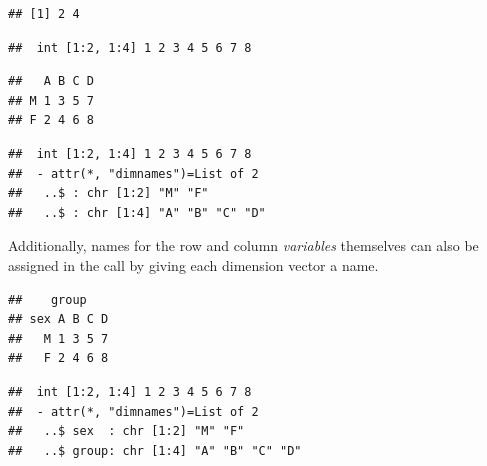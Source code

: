 \documentclass[11pt]{book}
\renewenvironment{knitrout}{\small\renewcommand{\baselinestretch}{.85}}{} %
\begin{document}
\begin{knitrout}
\color{fgcolor}\begin{kframe}
\begin{alltt}
\end{alltt}
\begin{verbatim}
## [1] 2 4
\end{verbatim}
\begin{alltt}
\end{alltt}
\begin{verbatim}
##  int [1:2, 1:4] 1 2 3 4 5 6 7 8
\end{verbatim}
\begin{alltt}
 \hlkwb{<-} \hlstd{(}\hlstd{(}\hlstd{,}\hlstd{), LETTERS[}\hlopt{:}\hlstd{])}
\end{alltt}
\begin{verbatim}
##   A B C D
## M 1 3 5 7
## F 2 4 6 8
\end{verbatim}
\begin{alltt}
\end{alltt}
\begin{verbatim}
##  int [1:2, 1:4] 1 2 3 4 5 6 7 8
##  - attr(*, "dimnames")=List of 2
##   ..$ : chr [1:2] "M" "F"
##   ..$ : chr [1:4] "A" "B" "C" "D"
\end{verbatim}
\end{kframe}
\end{knitrout}
Additionally, names for the row and column \emph{variables} themselves can also be assigned in the
 call by giving each dimension vector a name.
\begin{knitrout}
\color{fgcolor}\begin{kframe}
\begin{alltt}
 \hlkwb{<-} \hlstd{(}\hlstd{=}\hlstd{(}\hlstd{,}\hlstd{),} \hlstd{=LETTERS[}\hlopt{:}\hlstd{])}
\end{alltt}
\begin{verbatim}
##    group
## sex A B C D
##   M 1 3 5 7
##   F 2 4 6 8
\end{verbatim}
\begin{alltt}
\end{alltt}
\begin{verbatim}
##  int [1:2, 1:4] 1 2 3 4 5 6 7 8
##  - attr(*, "dimnames")=List of 2
##   ..$ sex  : chr [1:2] "M" "F"
##   ..$ group: chr [1:4] "A" "B" "C" "D"
\end{verbatim}
\end{kframe}
\end{knitrout}
\end{document}
